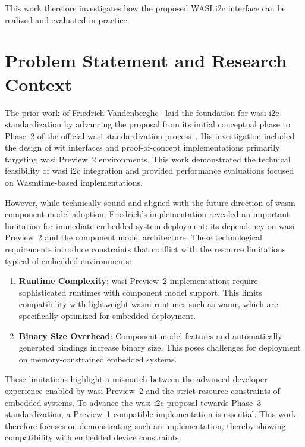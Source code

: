 This work therefore investigates how the proposed WASI \acrshort{i2c} interface can be realized and evaluated in practice.






\section*{Problem Statement and Research Context}
\label{sec:problem-statement}

The prior work of Friedrich Vandenberghe~\cite{friedrich_paper} laid the foundation for \acrshort{wasi} \acrshort{i2c} standardization by advancing the proposal from its initial conceptual phase to Phase~2 of the official \acrshort{wasi} standardization process~\cite{wasi_phases}. His investigation included the design of \acrshort{wit} interfaces and proof-of-concept implementations primarily targeting \acrshort{wasi} Preview~2 environments. This work demonstrated the technical feasibility of \acrshort{wasi} \acrshort{i2c} integration and provided performance evaluations focused on Wasmtime-based implementations.

However, while technically sound and aligned with the future direction of \acrshort{wasm} component model adoption, Friedrich's implementation revealed an important limitation for immediate embedded system deployment: its dependency on \acrshort{wasi} Preview~2 and the component model architecture. These technological requirements introduce constraints that conflict with the resource limitations typical of embedded environments:

\begin{enumerate}
    \item \textbf{Runtime Complexity}: \acrshort{wasi} Preview~2 implementations require sophisticated runtimes with component model support. This limits compatibility with lightweight \acrshort{wasm} runtimes such as \acrfull{wamr}, which are specifically optimized for embedded deployment.
    
    \item \textbf{Binary Size Overhead}: Component model features and automatically generated bindings increase binary size. This poses challenges for deployment on memory-constrained embedded systems.
\end{enumerate}

These limitations highlight a mismatch between the advanced developer experience enabled by \acrshort{wasi} Preview~2 and the strict resource constraints of embedded systems. To advance the \acrshort{wasi} \acrshort{i2c} proposal towards Phase~3 standardization, a Preview~1-compatible implementation is essential. This work therefore focuses on demonstrating such an implementation, thereby showing compatibility with embedded device constraints.





